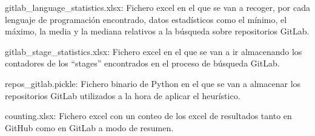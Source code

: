 \begin{compactitem}
    \item gitlab\_language\_statistics.xlsx: Fichero excel en el que se van a recoger, por cada lenguaje de programación encontrado, datos estadísticos como el mínimo, el máximo, la media y la mediana relativos a la búsqueda sobre repositorios GitLab.
    \item gitlab\_stage\_statistics.xlsx: Fichero excel en el que se van a ir almacenando los contadores de los ``stages'' encontrados en el proceso de búsqueda GitLab.
    \item repos\_gitlab.pickle: Fichero binario de Python en el que se van a almacenar los repositorios GitLab utilizados a la hora de aplicar el heurístico.
    \item counting.xlsx: Fichero excel con un conteo de los excel de resultados tanto en GitHub como en GitLab a modo de resumen.
\end{compactitem}

